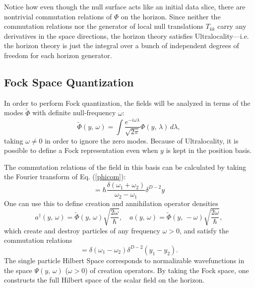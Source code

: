 \documentclass[12pt]{article}
\begin{document}
Notice how even though the null surface acts like an initial data slice, there are nontrivial commutation relations of $\Phi$ on the horizon.  Since neither the commutation relations nor the generator of local null translations $T_{kk}$ carry any derivatives in the space directions, the horizon theory satisfies Ultralocality---i.e. the horizon theory is just the integral over a bunch of independent degrees of freedom for each horizon generator.

\subsection{Fock Space Quantization}\label{fock}

In order to perform Fock quantization, the fields will be analyzed in terms of the modes $\tilde{\Phi}$ with definite null-frequency $\omega$:
\begin{equation}
\tilde{\Phi}(y,\,\omega) = \int
\frac{e^{-i\omega \lambda}}{\sqrt{2\pi}} \Phi(y,\,\lambda)\,d\lambda,
\end{equation}
taking $\omega \ne 0$ in order to ignore the zero modes.  Because of Ultralocality, it is possible to define a Fock representation even when $y$ is kept in the position basis.

The commutation relations of the field in this basis can be calculated by taking the Fourier transform of Eq. (\ref{phicom}):
\begin{equation}
[\tilde{\Phi}(y_1,\,\omega_1),\,\tilde{\Phi}(y_2,\,\omega_2)] =
\hbar \frac{\delta(\omega_1 + \omega_2)}{\omega_2 - \omega_1} \delta^{D-2}y
\end{equation}
One can use this to define creation and annihilation operator densities
\begin{equation}
a^{\dagger}(y,\,\omega) = \tilde{\Phi}(y,\,\omega) \sqrt{\frac{2\omega}{\hbar}}, \quad
a(y,\,\omega) = \tilde{\Phi}(y,\,-\omega) \sqrt{\frac{2\omega}{\hbar}},
\end{equation}
which create and destroy particles of any frequency $\omega > 0$, and satisfy the commutation relations
\begin{equation}
[a(y_1,\,\omega_1),\,a^\dagger(y_2,\,\omega_2)] =
\delta(\omega_1 - \omega_2) \delta^{D-2}(y_1 - y_2).
\end{equation}
The single particle Hilbert Space corresponds to normalizable wavefunctions in the space $\Psi(y,\,\omega)$ ($\omega > 0$) of creation operators.  By taking the Fock space, one constructs the full Hilbert space of the scalar field on the horizon.
\end{document}
